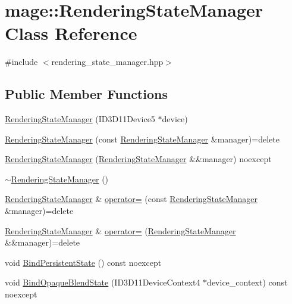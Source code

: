 \hypertarget{classmage_1_1_rendering_state_manager}{}\section{mage\+:\+:Rendering\+State\+Manager Class Reference}
\label{classmage_1_1_rendering_state_manager}


{\ttfamily \#include $<$rendering\+\_\+state\+\_\+manager.\+hpp$>$}

\subsection*{Public Member Functions}
\begin{DoxyCompactItemize}
\item 
\hyperlink{classmage_1_1_rendering_state_manager_a7e2ae8265b322b0700fd5ade4b791aea}{Rendering\+State\+Manager} (I\+D3\+D11\+Device5 $\ast$device)
\item 
\hyperlink{classmage_1_1_rendering_state_manager_a3b9b63fd7d9d61fa47a65aba65cf878e}{Rendering\+State\+Manager} (const \hyperlink{classmage_1_1_rendering_state_manager}{Rendering\+State\+Manager} \&manager)=delete
\item 
\hyperlink{classmage_1_1_rendering_state_manager_a9a2aa81483a1b8407cef6e122158ce1f}{Rendering\+State\+Manager} (\hyperlink{classmage_1_1_rendering_state_manager}{Rendering\+State\+Manager} \&\&manager) noexcept
\item 
\hyperlink{classmage_1_1_rendering_state_manager_ad4865219aaaac55dd53c4ab51af8d63f}{$\sim$\+Rendering\+State\+Manager} ()
\item 
\hyperlink{classmage_1_1_rendering_state_manager}{Rendering\+State\+Manager} \& \hyperlink{classmage_1_1_rendering_state_manager_a7a0354bd17c097d1504e04ac0b409041}{operator=} (const \hyperlink{classmage_1_1_rendering_state_manager}{Rendering\+State\+Manager} \&manager)=delete
\item 
\hyperlink{classmage_1_1_rendering_state_manager}{Rendering\+State\+Manager} \& \hyperlink{classmage_1_1_rendering_state_manager_a0863253357334e568f71675c31205671}{operator=} (\hyperlink{classmage_1_1_rendering_state_manager}{Rendering\+State\+Manager} \&\&manager)=delete
\item 
void \hyperlink{classmage_1_1_rendering_state_manager_aadbe543fdb458104c42fe9182848805e}{Bind\+Persistent\+State} () const noexcept
\item 
void \hyperlink{classmage_1_1_rendering_state_manager_aa69d0694e8ebda3ba165a86bd1e61930}{Bind\+Opaque\+Blend\+State} (I\+D3\+D11\+Device\+Context4 $\ast$device\+\_\+context) const noexcept

\end{DoxyCompactItemize}
